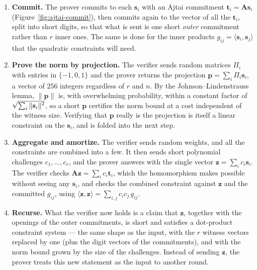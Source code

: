 \begin{enumerate}
  \item \textbf{Commit.} The prover commits to each $\mathbf{s}_i$ with an
        Ajtai commitment $\mathbf{t}_i=\mathbf{A}\mathbf{s}_i$
        (Figure~\ref{fig:ajtai-commit}), then commits again to the vector of
        all the $\mathbf{t}_i$, split into short digits, so that what is sent
        is one short \emph{outer} commitment rather than $r$ inner ones. The
        same is done for the inner products
        $g_{ij}=\langle\mathbf{s}_i,\mathbf{s}_j\rangle$ that the quadratic
        constraints will need.
  \item \textbf{Prove the norm by projection.} The verifier sends random
        matrices $\Pi_i$ with entries in $\{-1,0,1\}$ and the prover returns
        the projection $\mathbf{p}=\sum_i\Pi_i\mathbf{s}_i$, a vector of $256$
        integers regardless of $r$ and $n$. By the Johnson--Lindenstrauss
        lemma, $\|\mathbf{p}\|$ is, with overwhelming probability, within a
        constant factor of $\sqrt{\smash[b]{\textstyle\sum_i\|\mathbf{s}_i\|^2}}$,
        so a short $\mathbf{p}$ certifies the norm bound at a cost independent
        of the witness size. Verifying that $\mathbf{p}$ really is the
        projection is itself a linear constraint on the $\mathbf{s}_i$, and is
        folded into the next step.
  \item \textbf{Aggregate and amortize.} The verifier sends random weights, and
        all the constraints are combined into a few. It then sends short
        polynomial challenges $c_1,\dots,c_r$, and the prover answers with the
        single vector $\mathbf{z}=\sum_i c_i\mathbf{s}_i$. The verifier checks
        $\mathbf{A}\mathbf{z}=\sum_i c_i\mathbf{t}_i$, which the homomorphism
        makes possible without seeing any $\mathbf{s}_i$, and checks the
        combined constraint against $\mathbf{z}$ and the committed $g_{ij}$,
        using $\langle\mathbf{z},\mathbf{z}\rangle=\sum_{i,j}c_ic_j\,g_{ij}$.
  \item \textbf{Recurse.} What the verifier now holds is a claim that
        $\mathbf{z}$, together with the openings of the outer commitments, is
        short and satisfies a dot-product constraint system --- the same shape
        as the input, with the $r$ witness vectors replaced by one (plus the
        digit vectors of the commitments), and with the norm bound grown by
        the size of the challenges. Instead of sending $\mathbf{z}$, the prover
        treats this new statement as the input to another round.
\end{enumerate}

